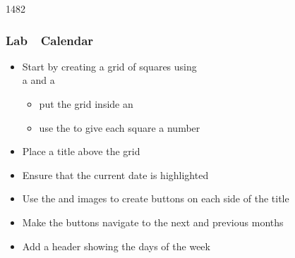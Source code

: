 \begin{slide}{1482}\frametitle{Lab~\textendash~Calendar}


\begin{itemize}
\item Start by creating a grid of squares using\\
      a  and a 
  \begin{itemize}
  \item put the grid inside an 
  \item use the  to give each square a number
  \end{itemize}
\item Place a title above the grid
\item Ensure that the current date is highlighted
\item Use the  and  images to
      create buttons on each side of the title
\item Make the buttons navigate to the next and previous months
\item Add a header showing the days of the week
\end{itemize}

\end{slide}
